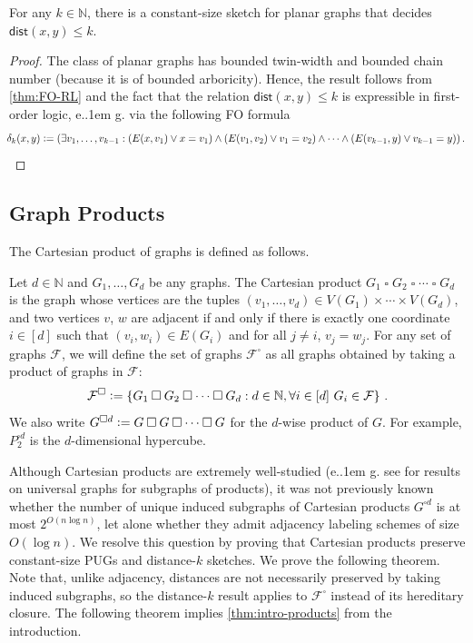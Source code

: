 \documentclass{article}
\makeatletter
\newcommand{\dist}{\mathsf{dist}}
\newcommand{\define}{\vcentcolon=}
\newcommand{\cF}{\ensuremath{\mathcal{F}}}
\newcommand{\bN}{\ensuremath{\mathbb{N}}}
\newcommand*\eg{e.\kern.1em g.\@\xspace} %
\makeatother
\begin{document}
\begin{corollary}
For any $k \in \bN$, there is a constant-size sketch for planar graphs that decides $\dist(x,y)
\leq k$.
\end{corollary}
\begin{proof}
	The class of planar graphs has bounded twin-width \cite{BKTW20} and bounded chain number (because it is of bounded arboricity). Hence, the result follows from \cref{thm:FO-RL} and the fact that 
	the relation $\dist(x,y) \leq k$ is expressible in first-order logic, \eg via the following FO formula
	\[
	\!\!\delta_k(x,y) \define (\exists v_1, \dotsc, v_{k-1} : (E(x,v_1) \vee x=v_1) \wedge
	(E(v_1,v_2) \vee v_1=v_2) \wedge
	\dotsm \wedge (E(v_{k-1},y) \vee v_{k-1}=y)) \,.
	\]
\end{proof}

\subsection{Graph Products}
\label{section:cartesian product}

The Cartesian product of graphs is defined as follows.

\begin{definition}
Let $d \in \bN$ and $G_1,\ldots,G_d$ be any graphs.  The Cartesian product $G_1 \mathbin\square G_2
\mathbin\square \cdots \mathbin\square G_d$ is the graph whose vertices are the tuples $(v_1,
\dotsc, v_d) \in V(G_1)\times\cdots\times V(G_d)$, and two vertices $v$, $w$ are adjacent if and
only if there is exactly one coordinate $i \in [d]$ such that $(v_i,w_i) \in E(G_i)$ and for all $j
\neq i$, $v_j=w_j$.  For any set of graphs $\cF$, we will define the set of graphs $\cF^\square$ as
all graphs obtained by taking a product of graphs in $\cF$:
\[
  \cF^\square \define \left\{ G_1 \mathbin\square G_2 \mathbin\square \dotsm \mathbin\square G_d : d \in \bN,
\forall i \in [d]\,\, G_i \in \cF \right\} \,.
\]
We also write $G^{\square d} \define G \mathbin\square G \mathbin\square \dotsm \mathbin\square G$ for the $d$-wise product
of $G$.  For example, $P_2^{\square d}$ is the $d$-dimensional hypercube.
\end{definition}
Although Cartesian products are extremely well-studied (\eg see \cite{CLR20} for results on
universal graphs for subgraphs of products), it was not previously known whether the number of
unique induced subgraphs of Cartesian products $G^{\square d}$ is at most $2^{O(n \log n)}$, let
alone whether they admit adjacency labeling schemes of size $O(\log n)$. We resolve this question by
proving that Cartesian products preserve constant-size PUGs and distance-$k$ sketches.  We prove the
following theorem. Note that, unlike adjacency, distances are not necessarily preserved by taking
induced subgraphs, so the distance-$k$ result applies to $\cF^\square$ instead of its hereditary
closure. The following theorem implies \cref{thm:intro-products} from the introduction.
\end{document}
